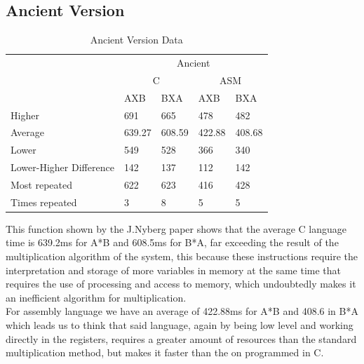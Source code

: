 \documentclass[legalpaper,12pt]{article}
\begin{document}
\subsection{Ancient Version}
    \begin{table}[h]
        \caption{Ancient Version Data}
        \centering
        \begin{tabular}{|l|l|l|l|l|}
        \hline
        \multirow{3}{*}{}       & \multicolumn{4}{c|}{Ancient}                      \\ \cline{2-5} 
                                & \multicolumn{2}{c|}{C} & \multicolumn{2}{c|}{ASM} \\ \cline{2-5} 
                                & AXB        & BXA       & AXB         & BXA        \\ \hline
        Higher                  & 691        & 665       & 478         & 482        \\ \hline
        Average                 & 639.27     & 608.59    & 422.88      & 408.68     \\ \hline
        Lower                   & 549        & 528       & 366         & 340        \\ \hline\hline
        Lower-Higher Difference & 142        & 137       & 112         & 142        \\ \hline\hline
        Most repeated           & 622        & 623       & 416         & 428        \\ \hline
        Times repeated          & 3          & 8         & 5           & 5          \\ \hline
        \end{tabular}
        \label{resultados3}
    \end{table}
    \justifying
    This function shown by the J.Nyberg paper shows that the average C language time is 639.2ms for A*B and 608.5ms for B*A, far exceeding the result of the multiplication algorithm of the system, this because these instructions require the interpretation and storage of more variables in memory at the same time that requires the use of processing and access to memory, which undoubtedly makes it an inefficient algorithm for multiplication. \\
    \justifying
    For assembly language we have an average of 422.88ms for A*B and 408.6 in B*A which leads us to think that said language, again by being low level and working directly in the registers, requires a greater amount of resources than the standard multiplication method, but makes it faster than the on programmed in C. \\
    
\end{document}
